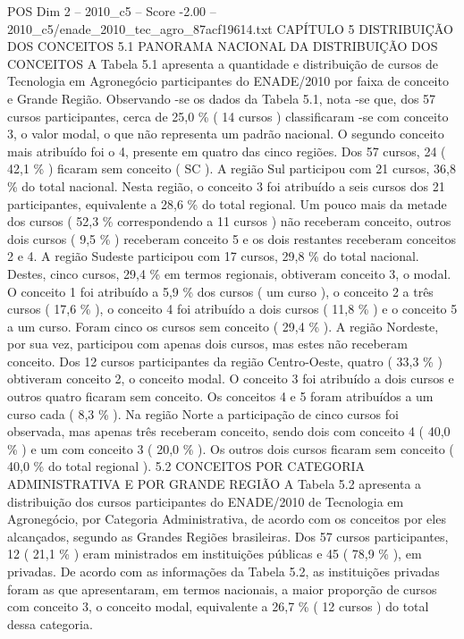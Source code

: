 \begin{textsample}{POS Dim 2 – 2010\_c5 – Score -2.00 – 2010\_c5/enade\_2010\_tec\_agro\_87acf19614.txt}  \label{ex:f2_pos_334}
CAPÍTULO 5 DISTRIBUIÇÃO DOS CONCEITOS 5.1 PANORAMA NACIONAL DA DISTRIBUIÇÃO DOS CONCEITOS A Tabela 5.1 apresenta a quantidade e distribuição de cursos de Tecnologia em Agronegócio participantes do ENADE/2010 por faixa de conceito e Grande Região.
Observando -se os dados da Tabela 5.1, nota -se que, dos 57 cursos participantes, cerca de 25,0 \% ( 14 cursos ) classificaram -se com conceito 3, o valor modal, o que não representa um padrão nacional.
O segundo conceito mais atribuído foi o 4, presente em quatro das cinco regiões.
Dos 57 cursos, 24 ( 42,1 \% ) ficaram sem conceito ( SC ).
A região Sul participou com 21 cursos, 36,8 \% do total nacional.
Nesta região, o conceito 3 foi atribuído a seis cursos dos 21 participantes, equivalente a 28,6 \% do total regional.
Um pouco mais da metade dos cursos ( 52,3 \% correspondendo a 11 cursos ) não receberam conceito, outros dois cursos ( 9,5 \% ) receberam conceito 5 e os dois restantes receberam conceitos 2 e 4.
A região Sudeste participou com 17 cursos, 29,8 \% do total nacional.
Destes, cinco cursos, 29,4 \% em termos regionais, obtiveram conceito 3, o modal.
O conceito 1 foi atribuído a 5,9 \% dos cursos ( um curso ), o conceito 2 a três cursos ( 17,6 \% ), o conceito 4 foi atribuído a dois cursos ( 11,8 \% ) e o conceito 5 a um curso.
Foram cinco os cursos sem conceito ( 29,4 \% ).
A região Nordeste, por sua vez, participou com apenas dois cursos, mas estes não receberam conceito.
Dos 12 cursos participantes da região Centro-Oeste, quatro ( 33,3 \% ) obtiveram conceito 2, o conceito modal.
O conceito 3 foi atribuído a dois cursos e outros quatro ficaram sem conceito.
Os conceitos 4 e 5 foram atribuídos a um curso cada ( 8,3 \% ).
Na região Norte a participação de cinco cursos foi observada, mas apenas três receberam conceito, sendo dois com conceito 4 ( 40,0 \% ) e um com conceito 3 ( 20,0 \% ).
Os outros dois cursos ficaram sem conceito ( 40,0 \% do total regional ). 5.2 CONCEITOS POR CATEGORIA ADMINISTRATIVA E POR GRANDE REGIÃO A Tabela 5.2 apresenta a distribuição dos cursos participantes do ENADE/2010 de Tecnologia em Agronegócio, por Categoria Administrativa, de acordo com os conceitos por eles alcançados, segundo as Grandes Regiões brasileiras.
Dos 57 cursos participantes, 12 ( 21,1 \% ) eram ministrados em instituições públicas e 45 ( 78,9 \% ), em privadas.
De acordo com as informações da Tabela 5.2, as instituições privadas foram as que apresentaram, em termos nacionais, a maior proporção de cursos com conceito 3, o conceito modal, equivalente a 26,7 \% ( 12 cursos ) do total dessa categoria.

\end{textsample}
